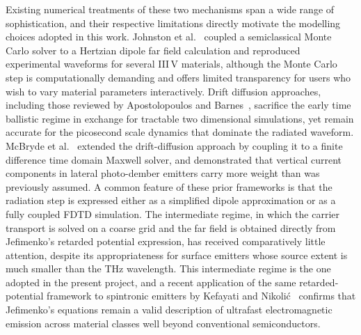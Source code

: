 \documentclass[12pt]{final_project_report}
\begin{document}
Existing numerical treatments of these two mechanisms span a wide range of sophistication, and their respective limitations directly motivate the modelling choices adopted in this work. Johnston et al.~\cite{SimulationTHz} coupled a semiclassical Monte Carlo solver to a Hertzian dipole far field calculation and reproduced experimental waveforms for several III\,V materials, although the Monte Carlo step is computationally demanding and offers limited transparency for users who wish to vary material parameters interactively. Drift diffusion approaches, including those reviewed by Apostolopoulos and Barnes~\cite{Apostolopoulos2014}, sacrifice the early time ballistic regime in exchange for tractable two dimensional simulations, yet remain accurate for the picosecond scale dynamics that dominate the radiated waveform. McBryde et al.~\cite{McBryde2018} extended the drift-diffusion approach by coupling it to a finite difference time domain Maxwell solver, and demonstrated that vertical current components in lateral photo-dember emitters carry more weight than was previously assumed. A common feature of these prior frameworks is that the radiation step is expressed either as a simplified dipole approximation or as a fully coupled FDTD simulation. The intermediate regime, in which the carrier transport is solved on a coarse grid and the far field is obtained directly from Jefimenko's retarded potential expression, has received comparatively little attention, despite its appropriateness for surface emitters whose source extent is much smaller than the THz wavelength. This intermediate regime is the one adopted in the present project, and a recent application of the same retarded-potential framework to spintronic emitters by Kefayati and Nikoli\'{c}~\cite{Kefayati2024} confirms that Jefimenko's equations remain a valid description of ultrafast electromagnetic emission across material classes well beyond conventional semiconductors.
\end{document}
